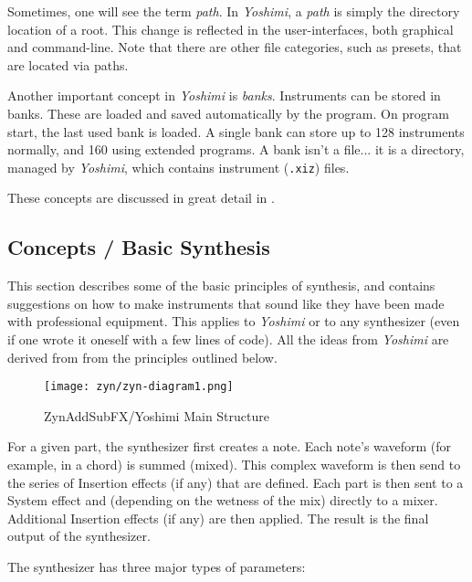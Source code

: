    Sometimes, one will see the term \textsl{path}.
   In \textsl{Yoshimi}, a \textsl{path} is simply the directory location of a
   root.  This change is reflected in the user-interfaces, both graphical and
   command-line.
   Note that there are other file categories, such as presets, that are located
   via paths.
   
   Another important concept in \textsl{Yoshimi} is \textsl{banks}.
   Instruments can be stored in banks. These are loaded and saved
   automatically by the program.  On program start, the last used bank is
   loaded.
   A single bank can store up to 128 instruments normally, and 160
   using extended programs.
   A bank isn't a file... it is a directory, managed by \textsl{Yoshimi},
   which contains instrument (\texttt{.xiz}) files.

   These concepts are discussed in great detail
   in .

\subsection{Concepts / Basic Synthesis}
\label{subsec:concepts_basics}

   This section describes some of the basic principles of synthesis,
   and contains suggestions on
   how to make instruments that sound like they have been made with
   professional equipment. This applies to \textsl{Yoshimi} or to any
   synthesizer (even if one wrote it oneself with a few lines of code). All
   the ideas from \textsl{Yoshimi} are derived from from the principles
   outlined below.

\begin{figure}[H]
   \centering 
   \texttt{[image: zyn/zyn-diagram1.png]}
   \caption{ZynAddSubFX/Yoshimi Main Structure}
   \label{fig:zynaddsubfx_main_structure}
\end{figure}

   For a given part, the synthesizer first creates a note.  Each note's
   waveform (for example, in a chord) is summed (mixed).  This complex
   waveform is then send to the series of Insertion effects (if any) that
   are defined.  Each part is then sent to a System effect and (depending on
   the wetness of the mix) directly to a mixer.  Additional Insertion
   effects (if any) are then applied.  The result is the final output of the
   synthesizer.

   The synthesizer has three major types of parameters: 

